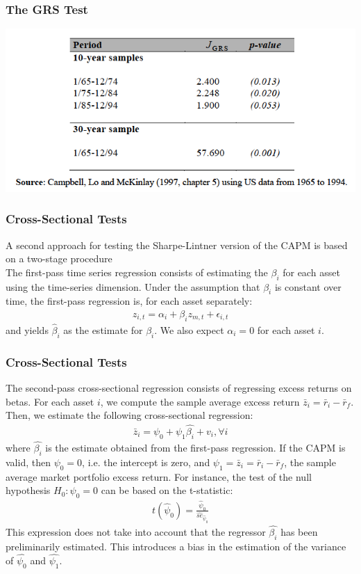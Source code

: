 \documentclass[xcolor=dvipsnames, english, 8pt]{beamer}
\begin{document}
\begin{frame}
    \frametitle{The GRS Test}
    \begin{center}
        \includegraphics[scale=0.5]{GRS}
    \end{center}


\end{frame}

\begin{frame}
    \frametitle{Cross-Sectional Tests}
    A second approach for testing the Sharpe-Lintner version of the CAPM is based on a {\color{ubRed}two-stage procedure}\vspace{0.5cm}\\

    {\color{ubRed} The first-pass time series regression} consists of estimating the $\beta_i$ for each asset using {\color{ubRed}the time-series dimension}. Under the assumption that $\beta_i$ is constant over time, the first-pass regression is, for each asset separately:
    \begin{align}
        z_{i,t} = \alpha_i + \beta_i z_{m,t} + \epsilon_{i,t}
    \end{align}
    and yields $ \hat{\beta}_i$ as the estimate for $\beta_i$. We also expect $\alpha_i = 0$ for each asset $i$.
\end{frame}

\begin{frame}
    \frametitle{Cross-Sectional Tests}
{\color{ubRed}The second-pass cross-sectional regression} consists of regressing excess returns on betas. For each asset $i$, we compute the sample average excess return $\bar{z}_i = \bar{r}_i - \bar{r}_f$. Then, we estimate the following {\color{ubRed} cross-sectional regression}:
\begin{align}
    \bar{z}_i = \psi_0 + \psi_1\hat{\beta_i}+ v_i, \forall i
\end{align}
where $\hat{\beta_i}$ is the estimate obtained from the first-pass regression. If the CAPM is valid, then $\psi_0 = 0$, i.e. the intercept is zero, and $\psi_1 = \bar{z}_i = \bar{r}_i - \bar{r}_f$, the sample average market portfolio excess return. For instance, the test of the null hypothesis $H_0:\psi_0 = 0$ can be based on the t-statistic:
\begin{align}
    t(\hat{\psi}_0) = \frac{\hat{\psi}_0}{\hat{se}_{\hat{\psi}_0}}
\end{align}
This expression does not take into account that the regressor $\hat{\beta_i}$ has been preliminarily estimated. This introduces a {\color{ubRed} bias in the estimation of the variance} of $\hat{\psi_0}$ and $\hat{\psi_1}$.
\end{frame}
\end{document}
